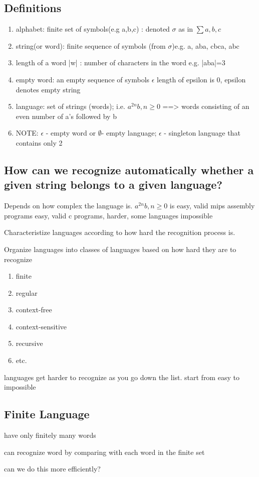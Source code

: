 \documentclass[11pt]{amsart}
\begin{document}
\subsection{Definitions}
\begin{enumerate}
  \item alphabet: finite set of symbols(e.g {a,b,c}) : denoted $\sigma$ as in
    $\sum{a,b,c}$
  \item string(or word): finite sequence of symbols (from $\sigma$)e.g. a, aba,
    cbca, abc
  \item length of a word |w| : number of characters in the word  e.g. |aba|=3
  \item empty word: an empty sequence of symbols $\epsilon$ length of epsilon
    is 0, epsilon denotes empty string
  \item language: set of strings (words); i.e. ${a^{2n}b, n\ge 0}$ ==> words
    consisting of an even number of a's followed by b
  \item NOTE: $\epsilon$ - empty word {} or $\emptyset$- empty language;
    ${\epsilon}$ - singleton language that contains only 2
\end{enumerate}
\subsection{How can we recognize automatically whether a given string
belongs to a given language?}
\par Depends on how complex the language is.  ${a^{2n}b, n\ge 0}$  is easy,
{valid mips assembly programs easy}, {valid c programs, harder}, {some
  languages} impossible
\par Characteristize languages according to how hard the recognition process
is.
\par Organize languages into classes of languages based on how hard they are to
recognize
\begin{enumerate}
  \item finite
  \item regular
  \item context-free
  \item context-sensitive
  \item recursive
  \item etc.
\end{enumerate}
\par  languages get harder to recognize as you go down the list. start from
easy to impossible
\subsection{Finite Language}
\begin{enum}
\item have only finitely many words
\item can recognize  word by comparing with each word in the finite set
\item can we do this more efficiently?
\end{enum}
\end{document}
